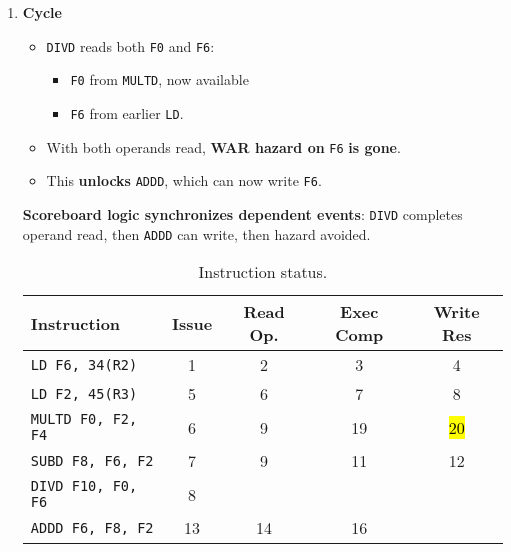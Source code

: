 \begin{enumerate}
    \newpage


    \item \textbf{Cycle \theenumi}
    \begin{itemize}
        \item[\textcolor{Green3}{\faIcon{check}}] \texttt{DIVD} reads both \texttt{F0} and \texttt{F6}:
        \begin{itemize}
            \item \texttt{F0} from \texttt{MULTD}, now available
            \item \texttt{F6} from earlier \texttt{LD}.
        \end{itemize}
        \item[\textcolor{Green3}{\faIcon{check}}] With both operands read, \textbf{WAR hazard on} \texttt{F6} \textbf{is gone}.
        \item[\textcolor{Green3}{\faIcon{check}}] This \textbf{unlocks} \texttt{ADDD}, which can now write \texttt{F6}.
    \end{itemize}
    \textbf{Scoreboard logic synchronizes dependent events}: \texttt{DIVD} completes operand read, then \texttt{ADDD} can write, then hazard avoided.

    \begin{table}[!htp]
        \centering
        \begin{tabular}{@{} l | c c c c @{}}
            \toprule
            Instruction                 & Issue     & Read Op.  & Exec Comp & Write Res \\
            \midrule
            \texttt{LD    F6, 34(R2)}   & 1         & 2         & 3         & 4         \\ [.3em]
            \texttt{LD    F2, 45(R3)}   & 5         & 6         & 7         & 8         \\ [.3em]
            \texttt{MULTD F0, F2, F4}   & 6         & 9         & 19        & \hl{20}   \\ [.3em]
            \texttt{SUBD  F8, F6, F2}   & 7         & 9         & 11        & 12        \\ [.3em]
            \texttt{DIVD  F10, F0, F6}  & 8         &           &           &           \\ [.3em]
            \texttt{ADDD  F6, F8, F2}   & 13        & 14        & 16        &           \\
            \bottomrule
        \end{tabular}
        \caption*{Instruction status.}
    \end{table}


\end{enumerate}
